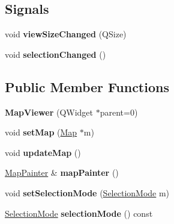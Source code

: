 \subsection*{Signals}
\begin{DoxyCompactItemize}
\item 
\hypertarget{class_map_viewer_afe0db95f8db428737b5225663dd2b127}{}\label{class_map_viewer_afe0db95f8db428737b5225663dd2b127} 
void {\bfseries view\+Size\+Changed} (Q\+Size)
\item 
\hypertarget{class_map_viewer_a60b95fc5e6817673a532b11a139a0eab}{}\label{class_map_viewer_a60b95fc5e6817673a532b11a139a0eab} 
void {\bfseries selection\+Changed} ()
\end{DoxyCompactItemize}
\subsection*{Public Member Functions}
\begin{DoxyCompactItemize}
\item 
\hypertarget{class_map_viewer_ae2c78c6e6ac686b2db1f4b3a7e3f318a}{}\label{class_map_viewer_ae2c78c6e6ac686b2db1f4b3a7e3f318a} 
{\bfseries Map\+Viewer} (Q\+Widget $\ast$parent=0)
\item 
\hypertarget{class_map_viewer_a15df9bdd47e5ad36c67601d335bfa5f1}{}\label{class_map_viewer_a15df9bdd47e5ad36c67601d335bfa5f1} 
void {\bfseries set\+Map} (\hyperlink{class_map}{Map} $\ast$m)
\item 
\hypertarget{class_map_viewer_a723ad37abb7af9ecac0bdd68dd628e46}{}\label{class_map_viewer_a723ad37abb7af9ecac0bdd68dd628e46} 
void {\bfseries update\+Map} ()
\item 
\hypertarget{class_map_viewer_af30594b6df0ea90676a4dc4ec65abaca}{}\label{class_map_viewer_af30594b6df0ea90676a4dc4ec65abaca} 
\hyperlink{class_map_painter}{Map\+Painter} \& {\bfseries map\+Painter} ()
\item 
\hypertarget{class_map_viewer_ad4ef828182ead076c00d48827e401b5d}{}\label{class_map_viewer_ad4ef828182ead076c00d48827e401b5d} 
void {\bfseries set\+Selection\+Mode} (\hyperlink{class_map_viewer_a8a7a365452e5770c1fab21a9bfb0067d}{Selection\+Mode} m)
\item 
\hypertarget{class_map_viewer_a6bc885ec211a289c79949e88af654830}{}\label{class_map_viewer_a6bc885ec211a289c79949e88af654830} 
\hyperlink{class_map_viewer_a8a7a365452e5770c1fab21a9bfb0067d}{Selection\+Mode} {\bfseries selection\+Mode} () const
\end{DoxyCompactItemize}


